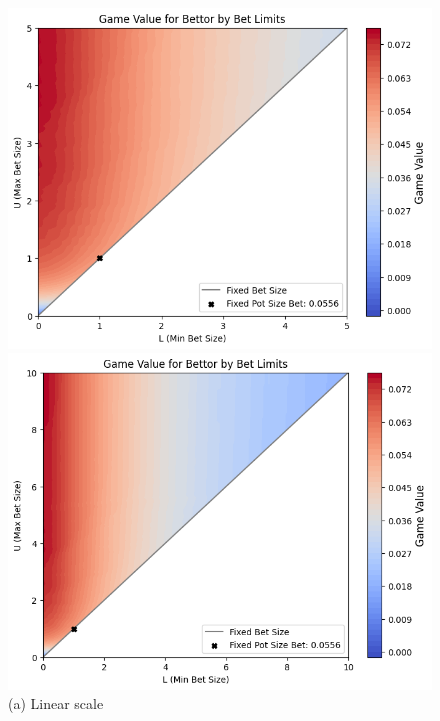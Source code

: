 \documentclass[a4paper,12pt]{article}
\theoremstyle{plain}
\theoremstyle{definition}
\begin{document}
\begin{figure}[h!]
    \begin{adjustwidth}{-1in}{-1in}
        \centering
        \begin{minipage}{0.6\textwidth}
            \centering
            \includegraphics[width=\textwidth]{value_by_LU.png}
            \caption*{(a) Linear scale}
        \end{minipage}
        \hspace{0.05\textwidth}
        \begin{minipage}{0.6\textwidth}
            \centering
            \includegraphics[width=\textwidth]{value_LU_wide.png}

\end{minipage}
\end{adjustwidth}
\end{figure}
\end{document}
